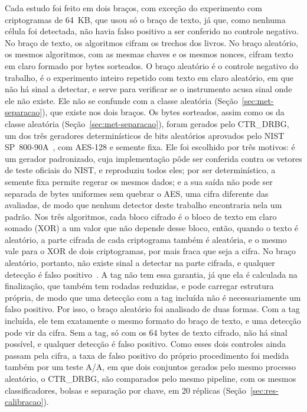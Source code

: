 Cada estudo foi feito em dois braços, com exceção do experimento com criptogramas de 64~KB, que usou só o braço de texto, já que, como nenhuma célula foi detectada, não havia falso positivo a ser conferido no controle negativo. No braço de texto, os algoritmos cifram os trechos dos livros. No braço aleatório, os mesmos algoritmos, com as mesmas chaves e os mesmos nonces, cifram texto em claro formado por bytes sorteados. O braço aleatório é o controle negativo do trabalho, é o experimento inteiro repetido com texto em claro aleatório, em que não há sinal a detectar, e serve para verificar se o instrumento acusa sinal onde ele não existe. Ele não se confunde com a classe aleatória (Seção~\ref{sec:met-separacao}), que existe nos dois braços. Os bytes sorteados, assim como os da classe aleatória (Seção~\ref{sec:met-separacao}), foram gerados pelo CTR\_DRBG, um dos três geradores determinísticos de bits aleatórios aprovados pelo NIST SP~800-90A~\cite{NISTSP80090A}, com AES-128 e semente fixa. Ele foi escolhido por três motivos: é um gerador padronizado, cuja implementação pôde ser conferida contra os vetores de teste oficiais do NIST, e reproduziu todos eles; por ser determinístico, a semente fixa permite regerar os mesmos dados; e a sua saída não pode ser separada de bytes uniformes sem quebrar o AES, uma cifra diferente das avaliadas, de modo que nenhum detector deste trabalho encontraria nela um padrão. Nos três algoritmos, cada bloco cifrado é o bloco de texto em claro somado (XOR) a um valor que não depende desse bloco, então, quando o texto é aleatório, a parte cifrada de cada criptograma também é aleatória, e o mesmo vale para o XOR de dois criptogramas, por mais fraca que seja a cifra. No braço aleatório, portanto, não existe sinal a detectar na parte cifrada, e qualquer detecção é falso positivo~\cite{shannon_1949,KatzLindell2014IMC}. A tag não tem essa garantia, já que ela é calculada na finalização, que também tem rodadas reduzidas, e pode carregar estrutura própria, de modo que uma detecção com a tag incluída não é necessariamente um falso positivo. Por isso, o braço aleatório foi analisado de duas formas. Com a tag incluída, ele tem exatamente o mesmo formato do braço de texto, e uma detecção pode vir da cifra. Sem a tag, só com os 64 bytes de texto cifrado, não há sinal possível, e qualquer detecção é falso positivo. Como esses dois controles ainda passam pela cifra, a taxa de falso positivo do próprio procedimento foi medida também por um teste A/A, em que dois conjuntos gerados pelo mesmo processo aleatório, o CTR\_DRBG, são comparados pelo mesmo pipeline, com os mesmos classificadores, bolsas e separação por chave, em 20 réplicas (Seção~\ref{sec:res-calibracao}).

